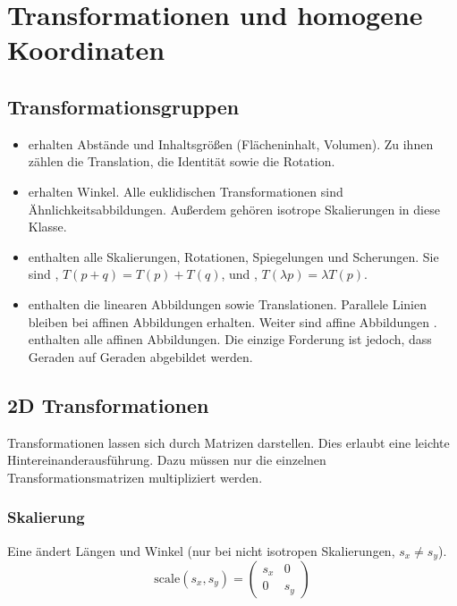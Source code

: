 \chapter{Transformationen und homogene Koordinaten}

\section{Transformationsgruppen}
\begin{itemize}
  \item {} erhalten Abstände und Inhaltsgrößen (Flächeninhalt, Volumen).
  Zu ihnen zählen die Translation, die Identität sowie die Rotation.
  \item {} erhalten Winkel.
  Alle euklidischen Transformationen sind Ähnlichkeitsabbildungen.
  Außerdem gehören isotrope Skalierungen in diese Klasse.
  \item {} enthalten alle Skalierungen, Rotationen,  Spiegelungen und Scherungen.
  Sie sind , $T(p + q) = T(p) + T(q)$, und , $T(\lambda p) = \lambda T(p)$.
  \item {} enthalten die linearen Abbildungen sowie Translationen.
  Parallele Linien bleiben bei affinen Abbildungen erhalten.
  Weiter sind affine Abbildungen .
   enthalten alle affinen Abbildungen.
  Die einzige Forderung ist jedoch, dass Geraden auf Geraden abgebildet werden.
\end{itemize}

\section{2D Transformationen}

Transformationen lassen sich durch Matrizen darstellen.
Dies erlaubt eine leichte Hintereinanderausführung.
Dazu müssen nur die einzelnen Transformationsmatrizen multipliziert werden.

\subsection{Skalierung}
Eine  ändert Längen und Winkel (nur bei nicht isotropen Skalierungen, $s_x \neq s_y$).
\[
  \mathrm{scale}(s_x, s_y) =
  \begin{pmatrix}
    s_x & 0 \\
    0   & s_y
  \end{pmatrix}
\]

